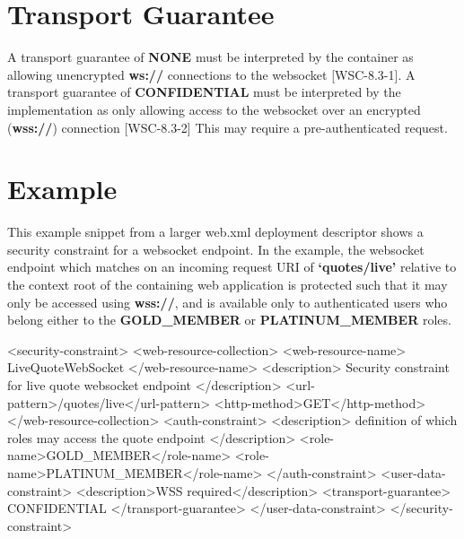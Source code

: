 \section{Transport Guarantee}

A transport guarantee of \textbf{NONE} must be interpreted by the container as allowing unencrypted \textbf{ws://} connections to the websocket [WSC-8.3-1]. A transport guarantee of \textbf{CONFIDENTIAL} must be interpreted by the implementation as only allowing access to the websocket over an encrypted (\textbf{wss://}) connection [WSC-8.3-2] This may require a pre-authenticated request. 

\section{Example}

This example snippet from a larger web.xml deployment descriptor shows a security constraint for a websocket endpoint. In the example, the websocket endpoint which matches on an incoming request URI of \textbf{`quotes/live'} relative to the context root of the containing web application is protected such that it may only be accessed using \textbf{wss://}, and is available only to authenticated users who belong either to the \textbf{GOLD\_MEMBER} or \textbf{PLATINUM\_MEMBER} roles.

\begin{listing}{1}
<security-constraint>
     <web-resource-collection>
          <web-resource-name>
			LiveQuoteWebSocket
		</web-resource-name>
          <description>
             Security constraint for
             live quote websocket endpoint
          </description>
          <url-pattern>/quotes/live</url-pattern>
          <http-method>GET</http-method>
     </web-resource-collection>
     <auth-constraint>
          <description>
            definition of which roles 
		  may access the quote endpoint
          </description>
          <role-name>GOLD_MEMBER</role-name>
          <role-name>PLATINUM_MEMBER</role-name>
     </auth-constraint>
     <user-data-constraint>
          <description>WSS required</description>
          <transport-guarantee>
		  CONFIDENTIAL
   		</transport-guarantee>
     </user-data-constraint>
</security-constraint>
\end{listing}
